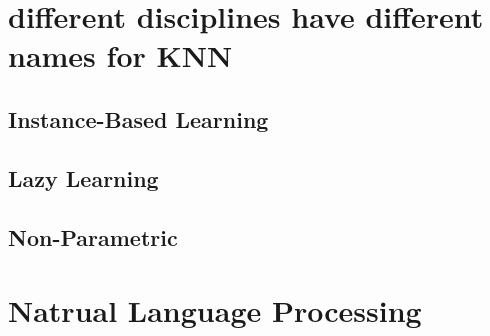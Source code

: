 \documentclass[14pt]{book}
\begin{document}
\section{different disciplines have different names for KNN}
\subsection{Instance-Based Learning}
\subsection{Lazy Learning}
\subsection{Non-Parametric}
\section{Natrual Language Processing}
\end{document}
